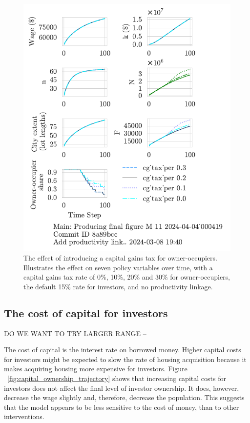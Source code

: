 \begin{figure}[h!t]
\centering
\includegraphics[scale=1.0, trim={0 1.4cm 0 0},clip]{fig/cg_tax_per-000419.pdf}
\caption[The effect of introducing a capital gains tax for owner-occupiers]{The effect of introducing a capital gains tax for owner-occupiers. Illustrates the effect on seven policy variables over time, with a capital gains tax rate of 0\%, 10\%, 20\% and 30\% for owner-occupiers, the default 15\% rate for investors, and no productivity linkage.}
\label{fig:CGpers_ownership_trajectory}
\end{figure}


\newpage

\subsection{The cost of capital for investors}

{\color{red} DO WE WANT TO TRY LARGER RANGE -- }

The cost of capital is the interest rate on borrowed money. Higher capital costs for investors might be expected to slow the rate of housing acquisition because it makes acquiring housing more expensive for investors. Figure ~\ref{fig:capital_ownership_trajectory} shows that increasing capital costs for investors does not affect the final level of investor ownership.  It does, however, decrease the wage slightly and, therefore, decrease the population. This suggests that the model appears to be less sensitive to the cost of money, than to other interventions. %

